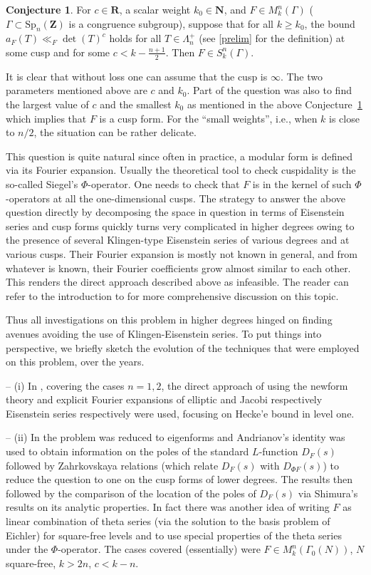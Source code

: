 \documentclass[12pt]{amsart}
\numberwithin{equation}{section}
\theoremstyle{plain}
\theoremstyle{definition}
\newtheorem{conj}[thm]{Conjecture}
\newcommand{\mf}{\mathbf}
\newcommand{\mrm}{\mathrm}
\newcommand{\spn}{\mrm{Sp}_n(\mf Z)}
\newcommand{\skgam}{S^n_k(\Gamma)}
\newcommand{\mkngam}{M^n_k(\Gamma)}
\newcommand{\mnk}{M^n_k(\Gamma_0(N))}
\begin{document}
\begin{conj} \label{main-conj}
For $c \in \mf R$, a scalar weight $k_0 \in \mf N$, and $F \in \mkngam$ ($\Gamma \subset \spn$ is a congruence subgroup), suppose that for all $k \ge k_0$, the bound $a_F(T) \ll_F \det(T)^c$ holds for all $T \in \Lambda_n^+$ (see \ref{prelim} for the definition) at some cusp and for some $c<k-\frac{n+1}{2}$. Then $F \in \skgam$.
\end{conj}
It is clear that without loss one can assume that the cusp is $\infty$. The two parameters mentioned above are $c$ and $k_0$. Part of the question was also to find the largest value of $c$ and the smallest $k_0$ as mentioned in the above Conjecture~\ref{main-conj} which implies that $F$ is a cusp form. For the ``small weights'', i.e., when $k$ is close to $n/2$, the situation can be rather delicate.

This question is quite natural since often in practice, a modular form is defined via its Fourier expansion. Usually the theoretical tool to check cuspidality is the so-called Siegel's $\Phi$-operator. One needs to check that $F$ is in the kernel of such $\Phi$-operators at all the one-dimensional cusps. The strategy to answer the above question directly by decomposing the space in question in terms of Eisenstein series and cusp forms quickly turns very complicated in higher degrees owing to the presence of several Klingen-type Eisenstein series of various degrees and at various cusps. Their Fourier expansion is mostly not known in general, and from whatever is known, their Fourier coefficients grow almost similar to each other. This renders the direct approach described above as infeasible. The reader can refer to the introduction to \cite{bo-ko, bo-das1, bo-das2} for more comprehensive discussion on this topic.

Thus all investigations on this problem in higher degrees hinged on finding avenues avoiding the use of Klingen-Eisenstein series. To put things into perspective, we briefly sketch the evolution of the techniques that were employed on this problem, over the years.

-- (i) In \cite{ko, ko-ma, lino}, covering the cases $n=1,2$, the direct approach of using the newform theory and explicit Fourier expansions of elliptic and Jacobi respectively Eisenstein series respectively were used, focusing on Hecke'e bound in level one.

-- (ii) In \cite{bo-das1} the problem was reduced to eigenforms and Andrianov's identity was used to obtain information on the poles of the standard $L$-function $D_F(s)$ followed by Zahrkovskaya relations (which relate $D_F(s)$ with $D_{\Phi F}(s)$) to reduce the question to one on the cusp forms of lower degrees. The  results then followed by the comparison of the location of the poles of $D_F(s)$ via Shimura's results on its analytic properties. In fact there was another idea of writing $F$ as linear combination of theta series (via the solution to the basis problem of Eichler) for square-free levels and to use special properties of the theta series under the $\Phi$-operator. The cases covered (essentially) were $F\in\mnk$, $N$ square-free, $k >2n$, $c< k-n$.
\end{document}

